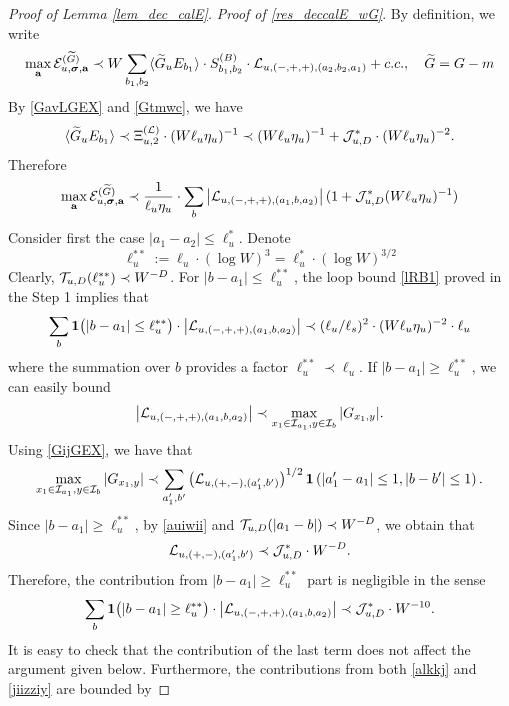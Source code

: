 \documentclass[10pt,reqno]{article}
\theoremstyle{plain} %
\theoremstyle{remark}
\numberwithin{equation}{section}
\begin{document}
\begin{proof}[Proof of Lemma \ref{lem_dec_calE}]
 
\medskip
\noindent 
\emph{Proof of   \eqref{res_deccalE_wG}}.    By definition, we  write 
\begin{align}
 \max_{\textbf{a}}{\cal E}^{(\widetilde G)}_{u,  \boldsymbol{\sigma},  \textbf{a} }
 \prec W \sum_{b_1,b_2} \langle \widetilde G_u E_{b_1}\rangle\cdot S^{(B)}_{b_1,b_2}\cdot  {\cal L}_{u, (-,+,+),(a_2, b_2, a_1)}+c.c.,\quad \widetilde{G}=G-m
 \end{align}
By \eqref{GavLGEX} and \eqref{Gtmwc}, we have 
$$
\langle \widetilde G_u E_{b_1}\rangle\prec \Xi^{(\cal L)}_{u,2}\cdot (W\ell_u\eta_u)^{-1}\prec  (W\ell_u\eta_u)^{-1}+ {\cal J}^*_{u,D}\cdot (W\ell_u\eta_u)^{-2}.
$$
Therefore 
 \begin{align}\label{jiizziy}
\max_{\textbf{a}}{\cal E}^{(\widetilde G)}_{u,  \boldsymbol{\sigma},  \textbf{a} } \prec \frac{1}{ \ell_u\eta_u} \cdot \sum_{b }   \left|{\cal L}_{u, (-,+,+),(a_1, b , a_2)}\right|(1+{\cal J}^*_{u,D}(W\ell_u\eta_u)^{-1})
\end{align}
Consider first the case  $|a_1-a_2|\le \ell_u^*$.  Denote 
$$
\ell_u^{**}:= \ell_u\cdot (\log W)^3=\ell^*_u\cdot (\log W)^{3/2}
$$
Clearly,  ${\cal T}_{u,D}(\ell_u^{**})\prec W^{-D}$. 
For $|b-a_1|\le  \ell_u^{**}$, 
the loop bound \eqref{lRB1}  proved in the Step 1 implies that 
\begin{align}\label{alkkj}
 \sum_{b }{\bf 1}\big(|b-a_1|\le  \ell_u^{** }\big)\cdot  \left|{\cal L}_{u, (-,+,+),(a_1, b , a_2)}\right|\prec (\ell_u/\ell_s)^2\cdot (W\ell_u\eta_u)^{-2} \cdot \ell_u   
\end{align}
where the summation over $b$ provides a factor $ \ell_u^{** } \prec\ell_u$. 
If $|b-a_1|\ge \ell_u^{**}$, we can easily bound 
 $$
 \left|{\cal L}_{u, (-,+,+),(a_1, b , a_2)}\right|\prec \max_{x_1\in {\cal I}_{a_1},y\in {\cal I}_{b}}|G_{x_1,y}|.
$$
Using  \eqref{GijGEX}, we have that 
$$
\max_{x_1\in {\cal I}_{a_1},y\in {\cal I}_{b}}|G_{x_1,y}|\prec \sum_{a_1', b'}\left({\cal L}_{u,(+,-),{(a_1',b')}}\right)^{1/2}{\bf1}\left(|a'_1-a_1|\le 1, |b-b'|\le 1\right).
$$
Since $|b-a_1|\ge \ell_u^{** }$, by  \eqref{auiwii} and ${\cal T}_{u,D}(|a_1-b|)\prec W^{-D}$, we obtain that  
$$
{\cal L}_{u,(+,-),{(a_1',b')}} \prec {\cal J}^*_{u,D}\cdot W^{-D}.
$$
Therefore, the contribution from $|b-a_1|\ge  \ell_u^{** }$ part is negligible in the sense 
\begin{align}\label{alkkj2}
 \sum_{b }{\bf 1}\big(|b-a_1|\ge  \ell_u^{** }\big)\cdot  \left|{\cal L}_{u, (-,+,+),(a_1, b , a_2)}\right|\prec  {\cal J}^*_{u,D}\cdot W^{-10}. 
\end{align}
It  is easy to check that the contribution of the last term does not affect the argument given below.  Furthermore,  the contributions from both  \eqref{alkkj} and  \eqref{jiizziy} are bounded by 

\end{proof}
\end{document}
